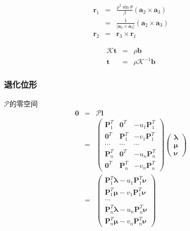 \documentclass{beamer}
\newcommand{\tmmathbf}[1]{\ensuremath{\boldsymbol{#1}}}
\begin{document}
{{\begin{frame}
  
  \begin{eqnarray*}
    \tmmathbf{r}_1 & = & \frac{\rho^2 \sin \theta}{\beta} (\tmmathbf{a}_2
    \times \tmmathbf{a}_3)\\
    & = & \frac{1}{| \tmmathbf{a}_2 \times \tmmathbf{a}_3 |} (\tmmathbf{a}_2
    \times \tmmathbf{a}_3)\\
    \tmmathbf{r}_2 & = & \tmmathbf{r}_3 \times \tmmathbf{r}_1
  \end{eqnarray*}
  
  \begin{eqnarray*}
    \mathcal{K}\tmmathbf{t} & = & \rho \tmmathbf{b}\\
    \tmmathbf{t} & = & \rho \mathcal{K}^{- 1} \tmmathbf{b}
  \end{eqnarray*}
\end{frame}}{\begin{frame}
  \frametitle{退化位形}
  
  $\mathcal{P}$的零空间
  \begin{eqnarray*}
    \tmmathbf{0} & = & \mathcal{P}\tmmathbf{l}\\
    & = & \left(\begin{array}{ccc}
      \tmmathbf{P}_1^T & \tmmathbf{0}^T & - u_1 \tmmathbf{P}_1^T\\
      \tmmathbf{0}^T & \tmmathbf{P}_1^T & - v_1 \tmmathbf{P}_1^T\\
      \cdots & \cdots & \cdots\\
      \tmmathbf{P}_n^T & \tmmathbf{0}^T & - u_n \tmmathbf{P}_n^T\\
      \tmmathbf{0}^T & \tmmathbf{P}_n^T & - v_n \tmmathbf{P}_n^T
    \end{array}\right) \left(\begin{array}{c}
      \tmmathbf{\lambda}\\
      \tmmathbf{\mu}\\
      \tmmathbf{\nu}
    \end{array}\right)\\
    & = & \left(\begin{array}{c}
      \tmmathbf{P}_1^T \tmmathbf{\lambda}- u_1 \tmmathbf{P}_1^T
      \tmmathbf{\nu}\\
      \tmmathbf{P}_1^T \tmmathbf{\mu}- v_1 \tmmathbf{P}_1^T \tmmathbf{\nu}\\
      \cdots\\
      \tmmathbf{P}_n^T \tmmathbf{\lambda}- u_n \tmmathbf{P}_n^T
      \tmmathbf{\nu}\\
      \tmmathbf{P}_n^T \tmmathbf{\mu}- v_n \tmmathbf{P}_n^T \tmmathbf{\nu}
    \end{array}\right)
  \end{eqnarray*}
\end{frame}}{\begin{frame}
  

\end{frame}}}
\end{document}
